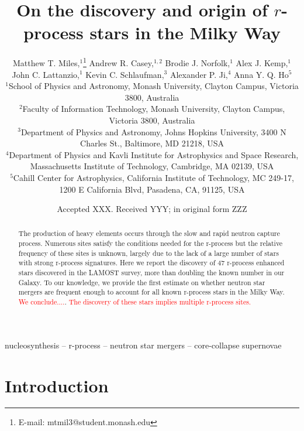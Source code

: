 \documentclass[a4paper,fleqn,usenatbib]{mnras}
\title[Discovery and origin of $r$-process stars]{On the discovery and origin of $r$-process stars in the Milky Way}
\author[Matthew T. Miles et al.]{Matthew T. Miles,$^{1}$\thanks{E-mail: mtmil3@student.monash.edu}
	Andrew R. Casey,$^{1,2}$
	Brodie J. Norfolk,$^{1}$
	Alex J. Kemp,$^{1}$\newauthor
	John C. Lattanzio,$^{1}$
	Kevin C. Schlaufman,$^{3}$
	Alexander P. Ji,$^{4}$
	Anna Y. Q. Ho$^{5}$
	\\
	$^{1}$School of Physics and Astronomy, Monash University, Clayton Campus, Victoria 3800, Australia\\
	$^{2}$Faculty of Information Technology, Monash University, Clayton Campus, Victoria 3800, Australia\\
	$^{3}$Department of Physics and Astronomy, Johns Hopkins University, 3400 N Charles St., Baltimore, MD 21218, USA\\
	$^{4}$Department of Physics and Kavli Institute for Astrophysics and Space Research, Massachusetts Institute of Technology, Cambridge, MA 02139, USA\\
	$^{5}$Cahill Center for Astrophysics, California Institute of Technology, MC 249-17, 1200 E California Blvd, Pasadena, CA, 91125, USA
}
\date{Accepted XXX. Received YYY; in original form ZZZ}
\newcommand{\todo}[1]{\textcolor{red}{#1}}
\begin{document}
	\label{firstpage}
	\pagerange{\pageref{firstpage}--\pageref{lastpage}}
	\maketitle
	
	\begin{abstract}
		The production of heavy elements occurs through the slow and rapid neutron capture process. Numerous sites satisfy the conditions needed for the r-process but the relative frequency of these sites is unknown, largely due to the lack of a large number of stars with strong r-process signatures. Here we report the discovery of 47 r-process enhanced stars discovered in the LAMOST survey, more than doubling the known number in our Galaxy. To our knowledge, we provide the first estimate on whether neutron star mergers are frequent enough to account for all known r-process stars in the Milky Way. \todo{We conclude....}. \todo{The discovery of these stars implies multiple r-process sites.}
	\end{abstract}
	
	\begin{keywords}
		nucleosynthesis -- r-process -- neutron star mergers -- core-collapse supernovae
	\end{keywords}
	
	
	\section{Introduction}
	
\end{document}
